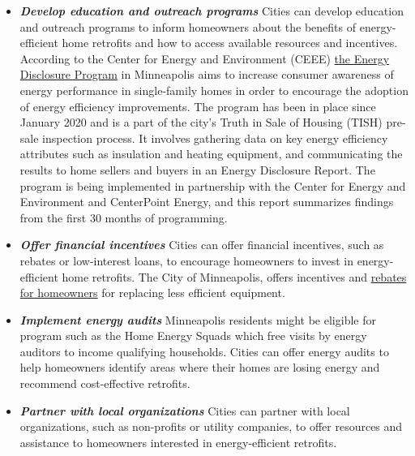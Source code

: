 \documentclass[
]{book}
\begin{document}
\begin{itemize}
\item
  \textbf{\emph{Develop education and outreach programs}} Cities can develop education and outreach programs to inform homeowners about the benefits of energy-efficient home retrofits and how to access available resources and incentives. According to the Center for Energy and Environment (CEEE) \href{https://www.mncee.org/energy-disclosure-impact-report-january-2020-through-june-2022}{the Energy Disclosure Program} in Minneapolis aims to increase consumer awareness of energy performance in single-family homes in order to encourage the adoption of energy efficiency improvements. The program has been in place since January 2020 and is a part of the city's Truth in Sale of Housing (TISH) pre-sale inspection process. It involves gathering data on key energy efficiency attributes such as insulation and heating equipment, and communicating the results to home sellers and buyers in an Energy Disclosure Report. The program is being implemented in partnership with the Center for Energy and Environment and CenterPoint Energy, and this report summarizes findings from the first 30 months of programming.
\item
  \textbf{\emph{Offer financial incentives}} Cities can offer financial incentives, such as rebates or low-interest loans, to encourage homeowners to invest in energy-efficient home retrofits. The City of Minneapolis, offers incentives and \href{https://www2.minneapolismn.gov/business-services/licenses-permits-inspections/construction-permits-certificates/construction-code-rules-enforcement/incentives-rebates/}{rebates for homeowners} for replacing less efficient equipment.
\end{itemize}

\begin{itemize}
\item
  \textbf{\emph{Implement energy audits}} Minneapolis residents might be eligible for program such as the Home Energy Squads which free visits by energy auditors to income qualifying households. Cities can offer energy audits to help homeowners identify areas where their homes are losing energy and recommend cost-effective retrofits.
\item
  \textbf{\emph{Partner with local organizations}} Cities can partner with local organizations, such as non-profits or utility companies, to offer resources and assistance to homeowners interested in energy-efficient retrofits.
\end{itemize}
\end{document}
